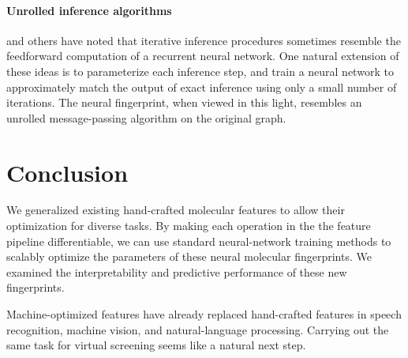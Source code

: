 \documentclass{article}
\begin{document}
\paragraph{Unrolled inference algorithms}
\citet{hershey2014deep} and others have noted that iterative inference procedures sometimes resemble the feedforward computation of a recurrent neural network.
One natural extension of these ideas is to parameterize each inference step, and train a neural network to approximately match the output of exact inference using only a small number of iterations.
The neural fingerprint, when viewed in this light, resembles an unrolled message-passing algorithm on the original graph.


\section{Conclusion}
We generalized existing hand-crafted molecular features to allow their optimization for diverse tasks.
By making each operation in the the feature pipeline differentiable, we can use standard neural-network training methods to scalably optimize the parameters of these neural molecular fingerprints.
We examined the interpretability and predictive performance of these new fingerprints.

Machine-optimized features have already replaced hand-crafted features in speech recognition, machine vision, and natural-language processing.
Carrying out the same task for virtual screening seems like a natural next step.



\end{document}
